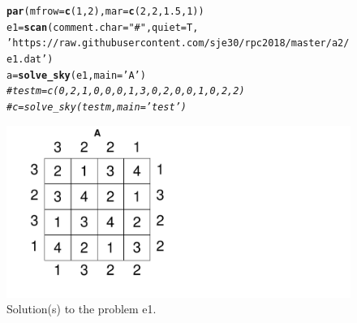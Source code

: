 \documentclass[12pt]{article}\usepackage[]{graphicx}\usepackage[]{color}
\makeatletter
\newcommand{\hlnum}[1]{\textcolor[rgb]{0.686,0.059,0.569}{#1}}%
\newcommand{\hlstr}[1]{\textcolor[rgb]{0.192,0.494,0.8}{#1}}%
\newcommand{\hlcom}[1]{\textcolor[rgb]{0.678,0.584,0.686}{\textit{#1}}}%
\newcommand{\hlstd}[1]{\textcolor[rgb]{0.345,0.345,0.345}{#1}}%
\newcommand{\hlkwb}[1]{\textcolor[rgb]{0.69,0.353,0.396}{#1}}%
\newcommand{\hlkwc}[1]{\textcolor[rgb]{0.333,0.667,0.333}{#1}}%
\newcommand{\hlkwd}[1]{\textcolor[rgb]{0.737,0.353,0.396}{\textbf{#1}}}%
\newenvironment{kframe}{%
 \def\at@end@of@kframe{}%
 \ifinner\ifhmode%
  \def\at@end@of@kframe{\end{minipage}}%
  \begin{minipage}{\columnwidth}%
 \fi\fi%
 \def\FrameCommand##1{\hskip\@totalleftmargin \hskip-\fboxsep
 \colorbox{shadecolor}{##1}\hskip-\fboxsep
     \hskip-\linewidth \hskip-\@totalleftmargin \hskip\columnwidth}%
 \MakeFramed {\advance\hsize-\width
   \@totalleftmargin\z@ \linewidth\hsize
   \@setminipage}}%
 {\par\unskip\endMakeFramed%
 \at@end@of@kframe}
\newenvironment{knitrout}{}{} %
\makeatother
\begin{document}
\newpage

\begin{figure}[h!]
  \centering
\begin{knitrout}
\color{fgcolor}\begin{kframe}
\begin{alltt}
\hlkwd{par}\hlstd{(}\hlkwc{mfrow}\hlstd{=}\hlkwd{c}\hlstd{(}\hlnum{1}\hlstd{,}\hlnum{2}\hlstd{),}\hlkwc{mar}\hlstd{=}\hlkwd{c}\hlstd{(}\hlnum{2}\hlstd{,}\hlnum{2}\hlstd{,}\hlnum{1.5}\hlstd{,}\hlnum{1}\hlstd{))}
\hlstd{e1} \hlkwb{=} \hlkwd{scan}\hlstd{(}\hlkwc{comment.char}\hlstd{=}\hlstr{"#"}\hlstd{,} \hlkwc{quiet}\hlstd{=T,}
        \hlstr{'https://raw.githubusercontent.com/sje30/rpc2018/master/a2/e1.dat'}\hlstd{)}
\hlstd{a} \hlkwb{=} \hlkwd{solve_sky}\hlstd{(e1,} \hlkwc{main} \hlstd{=} \hlstr{'A'}\hlstd{)}
\hlcom{#testm = c(0,2,1,0, 0,0,1,3, 0,2,0,0, 1,0,2,2)}
\hlcom{#c = solve_sky(testm, main = 'test')}
\end{alltt}
\end{kframe}
\includegraphics[width=.7\linewidth]{figure/unnamed-chunk-6-1} 

\end{knitrout}
\caption{Solution(s) to the problem e1.}
\label{fig:plot2}
\end{figure}
\end{document}
